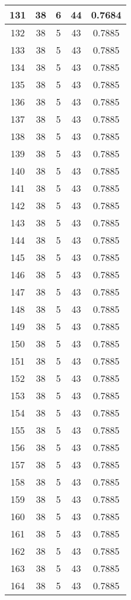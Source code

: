 \documentclass[letterpaper, 12pt]{article}
\begin{document}
\begin{longtable}{|c|c|c|c|c|}
\hline
131 & 38 & 6 & 44 & 0.7684 \\
\hline
132 & 38 & 5 & 43 & 0.7885 \\
\hline
133 & 38 & 5 & 43 & 0.7885 \\
\hline
134 & 38 & 5 & 43 & 0.7885 \\
\hline
135 & 38 & 5 & 43 & 0.7885 \\
\hline
136 & 38 & 5 & 43 & 0.7885 \\
\hline
137 & 38 & 5 & 43 & 0.7885 \\
\hline
138 & 38 & 5 & 43 & 0.7885 \\
\hline
139 & 38 & 5 & 43 & 0.7885 \\
\hline
140 & 38 & 5 & 43 & 0.7885 \\
\hline
141 & 38 & 5 & 43 & 0.7885 \\
\hline
142 & 38 & 5 & 43 & 0.7885 \\
\hline
143 & 38 & 5 & 43 & 0.7885 \\
\hline
144 & 38 & 5 & 43 & 0.7885 \\
\hline
145 & 38 & 5 & 43 & 0.7885 \\
\hline
146 & 38 & 5 & 43 & 0.7885 \\
\hline
147 & 38 & 5 & 43 & 0.7885 \\
\hline
148 & 38 & 5 & 43 & 0.7885 \\
\hline
149 & 38 & 5 & 43 & 0.7885 \\
\hline
150 & 38 & 5 & 43 & 0.7885 \\
\hline
151 & 38 & 5 & 43 & 0.7885 \\
\hline
152 & 38 & 5 & 43 & 0.7885 \\
\hline
153 & 38 & 5 & 43 & 0.7885 \\
\hline
154 & 38 & 5 & 43 & 0.7885 \\
\hline
155 & 38 & 5 & 43 & 0.7885 \\
\hline
156 & 38 & 5 & 43 & 0.7885 \\
\hline
157 & 38 & 5 & 43 & 0.7885 \\
\hline
158 & 38 & 5 & 43 & 0.7885 \\
\hline
159 & 38 & 5 & 43 & 0.7885 \\
\hline
160 & 38 & 5 & 43 & 0.7885 \\
\hline
161 & 38 & 5 & 43 & 0.7885 \\
\hline
162 & 38 & 5 & 43 & 0.7885 \\
\hline
163 & 38 & 5 & 43 & 0.7885 \\
\hline
164 & 38 & 5 & 43 & 0.7885 \\

\end{longtable}
\end{document}
